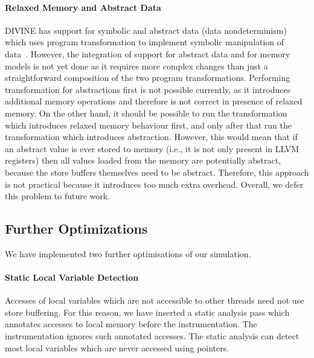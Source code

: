 \paragraph{Relaxed Memory and Abstract Data}
%
DIVINE has support for symbolic and abstract data (data nondeterminism) which
uses program transformation to implement symbolic manipulation of
data~.
However, the integration of support for abstract data and for memory models is
not yet done as it requires more complex changes than just a straightforward
composition of the two program transformations.
Performing transformation for abstractions first is not possible currently, as
it introduces additional memory operations and therefore is not correct in
presence of relaxed memory.
On the other hand, it should be possible to run the transformation which
introduces relaxed memory behaviour first, and only after that run the
transformation which introduces abstraction.
However, this would mean that if an abstract value is ever stored to memory
(i.e., it is not only present in LLVM registers) then all values loaded from
the memory are potentially abstract, because the store buffers themselves need
to be abstract.
Therefore, this approach is not practical because it introduces too much extra
overhead.
Overall, we defer this problem to future work.

\subsection{Further Optimizations} \label{sec:mm:opt}

We have implemented two further optimisations of our \xtso simulation.

\paragraph{Static Local Variable Detection}
Accesses of local variables which are not accessible to other threads need not
use store buffering.  For this reason, we have inserted a static analysis pass
which annotates accesses to local memory before the \xtso instrumentation.  The
instrumentation ignores such annotated accesses.  The static analysis can
detect most local variables which are never accessed using pointers.


